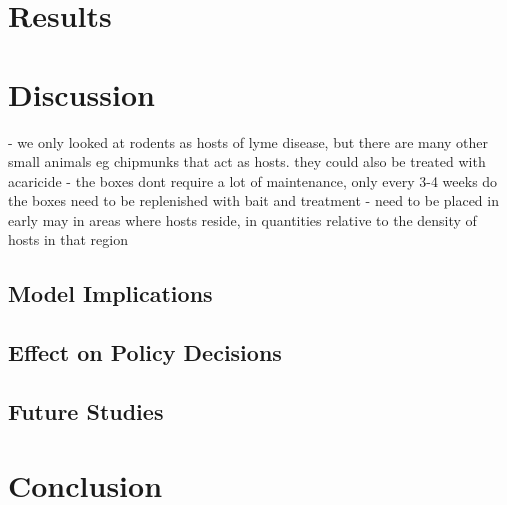 \documentclass[12pt, centerh1]{article}
\begin{document}
\section{Results}



\section{Discussion}

- we only looked at rodents as hosts of lyme disease, but there are many other small animals eg chipmunks that act as hosts. they could also be treated with acaricide 
- the boxes dont require a lot of maintenance, only every 3-4 weeks do the boxes need to be replenished with bait and treatment
- need to be placed in early may in areas where hosts reside, in quantities relative to the density of hosts in that region


\subsection{Model Implications}

\subsection{Effect on Policy Decisions}

\subsection{Future Studies}


\section{Conclusion}



\newpage

\end{document}
